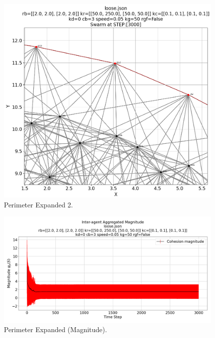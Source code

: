 \documentclass[12pt,a4paper]{IEEEtran}
\begin{document}
\begin{figure}[H]
	\begin{center}
		\includegraphics[width=1.0\linewidth]{figures/perimExpand2}
	\end{center}
	\caption{Perimeter Expanded 2. \label{fig:perimExpand2}}
\end{figure}

\begin{figure}[H]
	\begin{center}
		\includegraphics[width=1.0\linewidth]{figures/perimExpandMagnitude}
	\end{center}
	\caption{Perimeter Expanded (Magnitude). \label{fig:perimExpandMagnitude}}
\end{figure}
\end{document}
